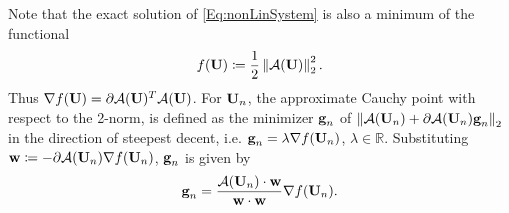 Note that the exact solution of \cref{Eq:nonLinSystem} is also a minimum of the functional
\begin{equation}
	f(\textbf{U}) \coloneqq \frac{1}{2}  \left\| \mathcal{A}(\textbf{U})  \right\|^2_2 .
\end{equation}
Thus $\nabla f(\textbf{U}) = \partial \mathcal{A}(\textbf{U})^T \mathcal{A}(\textbf{U})$.
For $\textbf{U}_n$, the approximate Cauchy point with respect to the 2-norm,
is defined as the minimizer $\textbf{g}_n$ of
$ \left\|  \mathcal{A}(\textbf{U}_{n}) + \partial \mathcal{A} (\textbf{U}_n) \textbf{g}_n \right\|_2  $
in the direction of steepest decent, i.e. $\textbf{g}_n = \lambda \nabla f(\textbf{U}_n)$, $\lambda \in \mathbb{R}$.
Substituting $\textbf{w} \coloneqq - \partial \mathcal{A}(\textbf{U}_n) \nabla f(\textbf{U}_n)$, $\textbf{g}_n$ is given by
\begin{equation}
	\textbf{g}_n = \frac{\mathcal{A}(\textbf{U}_n) \cdot \textbf{w}}{\textbf{w} \cdot \textbf{w}} \nabla f(\textbf{U}_n) .
	\label{eq:CauchyPoint}
\end{equation}

